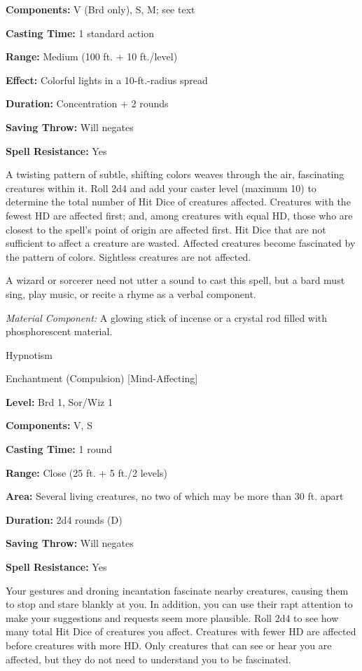 \documentclass{article}
\begin{document}
\textbf{Components:} V (Brd only), S, M; see text

\textbf{Casting Time:} 1 standard action

\textbf{Range: }Medium (100 ft. + 10 ft./level)

\textbf{Effect:} Colorful lights in a 10-ft.-radius spread

\textbf{Duration:} Concentration + 2 rounds

\textbf{Saving Throw: }Will negates

\textbf{Spell Resistance:} Yes

A twisting pattern of subtle, shifting colors weaves through the air, fascinating 
creatures within it. Roll 2d4 and add your caster level (maximum 10) to determine 
the total number of Hit Dice of creatures affected. Creatures with the fewest HD 
are affected first; and, among creatures with equal HD, those who are closest to 
the spell's point of origin are affected first. Hit Dice that are not sufficient 
to affect a creature are wasted. Affected creatures become fascinated by the pattern 
of colors. Sightless creatures are not affected.

A wizard or sorcerer need not utter a sound to cast this spell, but a bard must 
sing, play music, or recite a rhyme as a verbal component.

\textit{Material Component: }A glowing stick of incense or a crystal rod filled 
with phosphorescent material.

\vspace{12pt}
Hypnotism

Enchantment (Compulsion) [Mind-Affecting]

\textbf{Level:} Brd 1, Sor/Wiz 1

\textbf{Components:} V, S

\textbf{Casting Time:} 1 round

\textbf{Range:} Close (25 ft. + 5 ft./2 levels)

\textbf{Area:} Several living creatures, no two of which may be more than 30 ft. 
apart

\textbf{Duration:} 2d4 rounds (D)

\textbf{Saving Throw: }Will negates

\textbf{Spell Resistance:} Yes

Your gestures and droning incantation fascinate nearby creatures, causing them 
to stop and stare blankly at you. In addition, you can use their rapt attention 
to make your suggestions and requests seem more plausible. Roll 2d4 to see how 
many total Hit Dice of creatures you affect. Creatures with fewer HD are affected 
before creatures with more HD. Only creatures that can see or hear you are affected, 
but they do not need to understand you to be fascinated.
\end{document}
